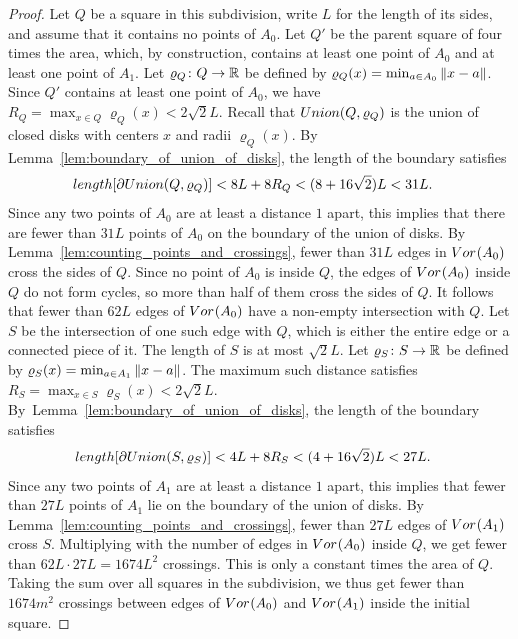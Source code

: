 \documentclass[a4paper]{article}
\newcommand {\mm}[1]   {\ifmmode{#1}\else{\mbox{\(#1\)}}\fi}
\newcommand{\Rspace}        {\mm{{\mathbb R}}}
\newcommand{\Voronoi}[2]    {\mm{{\rm Vor}_{#1}{({#2})}}}
\newcommand{\length}[1]     {\mm{\rm length}{[{#1}]}}
\newcommand{\Union}[2]      {\mm{\rm Union}{({#1},{#2})}}
\newcommand{\Edist}[2]      {\mm{\|{#1}-{#2}\|}}
\theoremstyle{definition}
\numberwithin{theorem}{section}
\numberwithin{equation}{section}
\begin{document}
\begin{proof}
  Let $Q$ be a square in this subdivision, write $L$ for the length of its sides, and assume that it contains no points of $A_0$.
  Let $Q'$ be the parent square of four times the area, which, by construction, contains at least one point of $A_0$ and at least one point of $A_1$.
  Let $\varrho_Q \colon Q \to \Rspace$ be defined by $\varrho_Q (x) = \min_{a \in A_0} \Edist{x}{a}$.
  Since $Q'$ contains at least one point of $A_0$, we have $R_Q = \max_{x \in Q} \varrho_Q (x) < 2 \sqrt{2} L$.
  Recall that $\Union{Q}{\varrho_Q}$ is the union of closed disks with centers $x$ and radii $\varrho_Q (x)$.
  By Lemma~\ref{lem:boundary_of_union_of_disks}, the length of the boundary satisfies
  \begin{align}
    \length{\partial \Union{Q}{\varrho_Q}}  &<  8L + 8R_Q  < (8 + 16 \sqrt{2}) L  <  31 L .
  \end{align}
  Since any two points of $A_0$ are at least a distance $1$ apart, this implies that there are fewer than $31 L$ points of $A_0$ on the boundary of the union of disks.
  By Lemma~\ref{lem:counting_points_and_crossings}, fewer than $31 L$ edges in $\Voronoi{}{A_0}$ cross the sides of $Q$.
  Since no point of $A_0$ is inside $Q$, the edges of $\Voronoi{}{A_0}$ inside $Q$ do not form cycles, so more than half of them cross the sides of $Q$.
  It follows that fewer than $62 L$ edges of $\Voronoi{}{A_0}$ have a non-empty intersection with $Q$.
  Let $S$ be the intersection of one such edge with $Q$, which is either the entire edge or a connected piece of it.
  The length of $S$ is at most $\sqrt{2} L$.
  Let $\varrho_S \colon S \to \Rspace$ be defined by $\varrho_S (x) = \min_{a \in A_1} \Edist{x}{a}$.
  The maximum such distance satisfies $R_S = \max_{x \in S} \varrho_S (x) < 2 \sqrt{2} L$.
  By~Lemma~\ref{lem:boundary_of_union_of_disks}, the length of the boundary satisfies
  \begin{align}
    \length{\partial \Union{S}{\varrho_S}}  &<  4L+8R_S  <  (4 + 16 \sqrt{2}) L  <  27 L .
  \end{align}
  Since any two points of $A_1$ are at least a distance $1$ apart, this implies that fewer than $27 L$ points of $A_1$ lie on the boundary of the union of disks.
  By Lemma~\ref{lem:counting_points_and_crossings}, fewer than $27 L$ edges of $\Voronoi{}{A_1}$ cross $S$.
  Multiplying with the number of edges in $\Voronoi{}{A_0}$ inside $Q$, we get fewer than $62 L \cdot 27 L = 1674 L^2$ crossings.
  This is only a constant times the area of $Q$.
  Taking the sum over all squares in the subdivision, we thus get fewer than $1674 m^2$ crossings between edges of $\Voronoi{}{A_0}$ and $\Voronoi{}{A_1}$ inside the initial square.
  

\end{proof}
\end{document}
